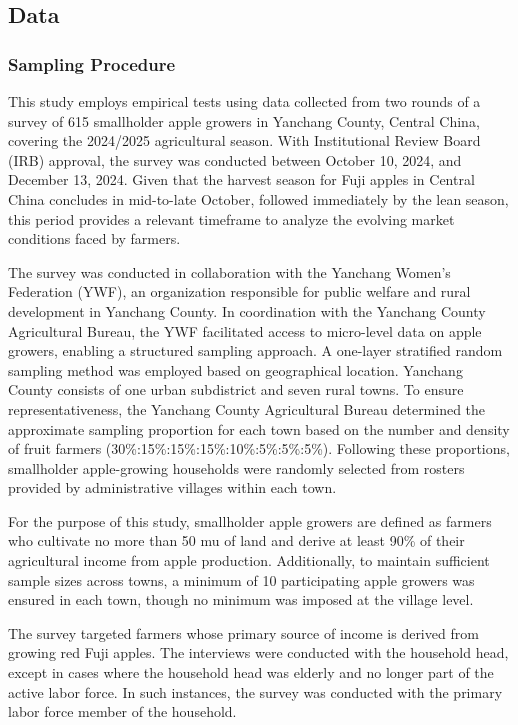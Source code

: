 \documentclass[12pt]{article}
\begin{document}
\subsection{Data}
\subsubsection{Sampling Procedure}
\noindent This study employs empirical tests using data collected from two rounds of a survey of 615 smallholder apple growers in Yanchang County, Central China, covering the 2024/2025 agricultural season. With Institutional Review Board (IRB) approval, the survey was conducted between October 10, 2024, and December 13, 2024. Given that the harvest season for Fuji apples in Central China concludes in mid-to-late October, followed immediately by the lean season, this period provides a relevant timeframe to analyze the evolving market conditions faced by farmers.

The survey was conducted in collaboration with the Yanchang Women's Federation (YWF), an organization responsible for public welfare and rural development in Yanchang County. In coordination with the Yanchang County Agricultural Bureau, the YWF facilitated access to micro-level data on apple growers, enabling a structured sampling approach. A one-layer stratified random sampling method was employed based on geographical location. Yanchang County consists of one urban subdistrict and seven rural towns. To ensure representativeness, the Yanchang County Agricultural Bureau determined the approximate sampling proportion for each town based on the number and density of fruit farmers (30\%:15\%:15\%:15\%:10\%:5\%:5\%:5\%). Following these proportions, smallholder apple-growing households were randomly selected from rosters provided by administrative villages within each town.

For the purpose of this study, smallholder apple growers are defined as farmers who cultivate no more than 50 mu of land and derive at least 90\% of their agricultural income from apple production. Additionally, to maintain sufficient sample sizes across towns, a minimum of 10 participating apple growers was ensured in each town, though no minimum was imposed at the village level.

The survey targeted farmers whose primary source of income is derived from growing red Fuji apples. The interviews were conducted with the household head, except in cases where the household head was elderly and no longer part of the active labor force. In such instances, the survey was conducted with the primary labor force member of the household.
\end{document}
